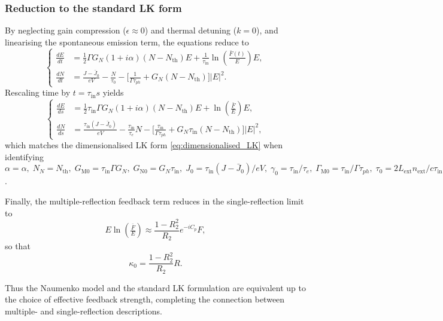 \subsubsection*{Reduction to the standard LK form}
%
By neglecting gain compression ($\epsilon \approx 0$) and thermal detuning ($k=0$), and linearising the spontaneous emission term, the equations reduce to
%
\begin{equation*}
\left\{
\begin{aligned}
\frac{d E}{d t} &= \tfrac{1}{2} \Gamma G_N(1+i \alpha)(N-N_\text{th}) E 
+ \frac{1}{\tau_\text{in}} \ln \!\left(\tfrac{\bar{F}(t)}{E}\right) E, \\
\frac{d N}{d t} &= \frac{J-\bar{J}_0}{e V}-\frac{N}{\tau_0}
-\Big[\tfrac{1}{\Gamma \tau_{ph}} + G_N(N-N_\text{th})\Big]|E|^2.
\end{aligned}
\right.
\end{equation*}
%
Rescaling time by $t=\tau_\text{in} s$ yields
%
\begin{equation*}
\left\{
\begin{aligned}
\frac{d E}{d s} &= \tfrac{1}{2} \tau_\text{in} \Gamma G_N(1+i \alpha)(N-N_{\text{th}}) E + \ln \!\left(\tfrac{\bar{F}}{E}\right) E, \\
\frac{d N}{d s} &= \tfrac{\tau_{\text{in}}(J-\bar{J}_0)}{e V}-\tfrac{\tau_\text{in}}{\tau_e} N
-\Big[\tfrac{\tau_\text{in}}{\Gamma \tau_{ph}}+G_N \tau_\text{in}(N-N_{\text{th}})\Big]|E|^2,
\end{aligned}
\right.
\end{equation*}
%
which matches the dimensionalised LK form \eqref{eq:dimensionalised_LK} when identifying
%
$
\alpha = \alpha, \; 
N_N = N_{\text{th}}, \; 
G_\text{M0} = \tau_\text{in} \Gamma G_N, \; 
G_\text{N0} = G_N \tau_\text{in}, \;
J_0 = \tau_\text{in}(J-\bar{J}_0)/e V, \;
\gamma_0 = \tau_\text{in}/\tau_e, \; 
\Gamma_\text{M0} = \tau_\text{in}/\Gamma \tau_{ph}, \; 
\tau_0 = 2 L_\text{ext} n_\text{ext}/c \tau_\text{in}
$.
%
\par
%
Finally, the multiple-reflection feedback term reduces in the single-reflection limit to
%
\begin{equation*}
    E \ln \left(\tfrac{\bar{F}}{E}\right) \approx \frac{1-R_2^2}{R_2} e^{-i C_p} F,
\end{equation*}
%
so that
%
\begin{equation*}
    \kappa_0 = \frac{1-R_2^2}{R_2} R.
\end{equation*}
%
\par
%
Thus the Naumenko model and the standard LK formulation are equivalent up to the choice of effective feedback strength, completing the connection between multiple- and single-reflection descriptions.
